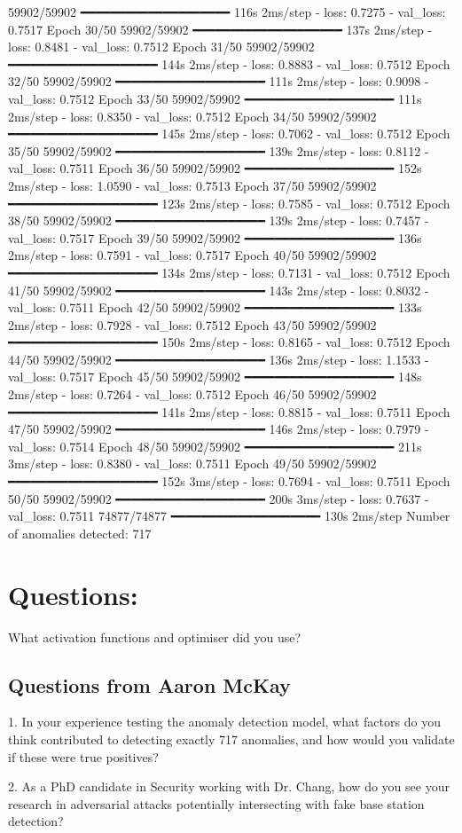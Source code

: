 59902/59902 ━━━━━━━━━━━━━━━━━━━━ 116s 2ms/step - loss: 0.7275 - val_loss: 0.7517
Epoch 30/50
59902/59902 ━━━━━━━━━━━━━━━━━━━━ 137s 2ms/step - loss: 0.8481 - val_loss: 0.7512
Epoch 31/50
59902/59902 ━━━━━━━━━━━━━━━━━━━━ 144s 2ms/step - loss: 0.8883 - val_loss: 0.7512
Epoch 32/50
59902/59902 ━━━━━━━━━━━━━━━━━━━━ 111s 2ms/step - loss: 0.9098 - val_loss: 0.7512
Epoch 33/50
59902/59902 ━━━━━━━━━━━━━━━━━━━━ 111s 2ms/step - loss: 0.8350 - val_loss: 0.7512
Epoch 34/50
59902/59902 ━━━━━━━━━━━━━━━━━━━━ 145s 2ms/step - loss: 0.7062 - val_loss: 0.7512
Epoch 35/50
59902/59902 ━━━━━━━━━━━━━━━━━━━━ 139s 2ms/step - loss: 0.8112 - val_loss: 0.7511
Epoch 36/50
59902/59902 ━━━━━━━━━━━━━━━━━━━━ 152s 2ms/step - loss: 1.0590 - val_loss: 0.7513
Epoch 37/50
59902/59902 ━━━━━━━━━━━━━━━━━━━━ 123s 2ms/step - loss: 0.7585 - val_loss: 0.7512
Epoch 38/50
59902/59902 ━━━━━━━━━━━━━━━━━━━━ 139s 2ms/step - loss: 0.7457 - val_loss: 0.7517
Epoch 39/50
59902/59902 ━━━━━━━━━━━━━━━━━━━━ 136s 2ms/step - loss: 0.7591 - val_loss: 0.7517
Epoch 40/50
59902/59902 ━━━━━━━━━━━━━━━━━━━━ 134s 2ms/step - loss: 0.7131 - val_loss: 0.7512
Epoch 41/50
59902/59902 ━━━━━━━━━━━━━━━━━━━━ 143s 2ms/step - loss: 0.8032 - val_loss: 0.7511
Epoch 42/50
59902/59902 ━━━━━━━━━━━━━━━━━━━━ 133s 2ms/step - loss: 0.7928 - val_loss: 0.7512
Epoch 43/50
59902/59902 ━━━━━━━━━━━━━━━━━━━━ 150s 2ms/step - loss: 0.8165 - val_loss: 0.7512
Epoch 44/50
59902/59902 ━━━━━━━━━━━━━━━━━━━━ 136s 2ms/step - loss: 1.1533 - val_loss: 0.7517
Epoch 45/50
59902/59902 ━━━━━━━━━━━━━━━━━━━━ 148s 2ms/step - loss: 0.7264 - val_loss: 0.7512
Epoch 46/50
59902/59902 ━━━━━━━━━━━━━━━━━━━━ 141s 2ms/step - loss: 0.8815 - val_loss: 0.7511
Epoch 47/50
59902/59902 ━━━━━━━━━━━━━━━━━━━━ 146s 2ms/step - loss: 0.7979 - val_loss: 0.7514
Epoch 48/50
59902/59902 ━━━━━━━━━━━━━━━━━━━━ 211s 3ms/step - loss: 0.8380 - val_loss: 0.7511
Epoch 49/50
59902/59902 ━━━━━━━━━━━━━━━━━━━━ 152s 3ms/step - loss: 0.7694 - val_loss: 0.7511
Epoch 50/50
59902/59902 ━━━━━━━━━━━━━━━━━━━━ 200s 3ms/step - loss: 0.7637 - val_loss: 0.7511
74877/74877 ━━━━━━━━━━━━━━━━━━━━ 130s 2ms/step
Number of anomalies detected: 717

\section*{Questions: }
What activation functions and optimiser did you use?

\subsection{Questions from Aaron McKay}
1. In your experience testing the anomaly detection model, what factors do you think contributed to detecting exactly 717 anomalies, and how would you validate if these were true positives?

2. As a PhD candidate in Security working with Dr. Chang, how do you see your research in adversarial attacks potentially intersecting with fake base station detection?
